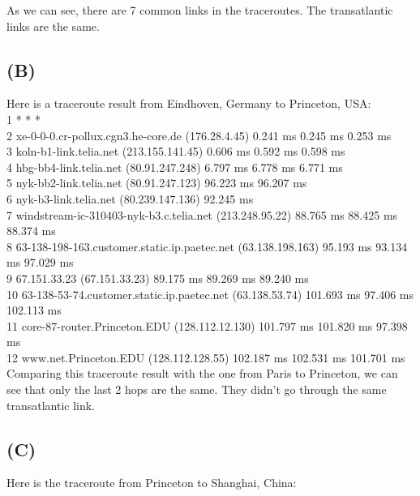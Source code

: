 \documentclass[titlepage, paper=a4, fontsize=11pt]{scrartcl} %
\numberwithin{equation}{section} %
\numberwithin{figure}{section} %
\numberwithin{table}{section} %
\begin{document}
As we can see, there are 7 common links in the traceroutes. The transatlantic links are the same.

\subsection*{(B)}
Here is a traceroute result from Eindhoven, Germany to Princeton, USA: \\

1  * * * \\
2  xe-0-0-0.cr-pollux.cgn3.he-core.de (176.28.4.45)  0.241 ms  0.245 ms  0.253 ms \\
3  koln-b1-link.telia.net (213.155.141.45)  0.606 ms  0.592 ms  0.598 ms \\
4  hbg-bb4-link.telia.net (80.91.247.248)  6.797 ms  6.778 ms  6.771 ms \\
5  nyk-bb2-link.telia.net (80.91.247.123)  96.223 ms  96.207 ms \\
6  nyk-b3-link.telia.net (80.239.147.136)  92.245 ms \\
7  windstream-ic-310403-nyk-b3.c.telia.net (213.248.95.22)  88.765 ms  88.425 ms  88.374 ms \\
8  63-138-198-163.customer.static.ip.paetec.net (63.138.198.163)  95.193 ms  93.134 ms  97.029 ms \\
9  67.151.33.23 (67.151.33.23)  89.175 ms  89.269 ms  89.240 ms \\
10  63-138-53-74.customer.static.ip.paetec.net (63.138.53.74)  101.693 ms  97.406 ms  102.113 ms \\
11  core-87-router.Princeton.EDU (128.112.12.130)  101.797 ms  101.820 ms  97.398 ms \\
12  www.net.Princeton.EDU (128.112.128.55)  102.187 ms  102.531 ms  101.701 ms
\\

Comparing this traceroute result with the one from Paris to Princeton, we can see that only the last 2 hops are the same. They didn't go through the same transatlantic link.

\subsection*{(C)}
Here is the traceroute from Princeton to Shanghai, China: \\
\end{document}
